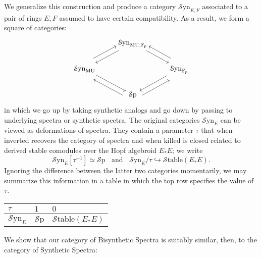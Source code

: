 \documentclass[10pt]{amsart}
\theoremstyle{definition}
\numberwithin{figure}{section}
\numberwithin{equation}{section}
\newcommand{\MU}{\mathrm{MU}}
\theoremstyle{cited}
\newcommand{\bF}{\mathbb{F}}
\newcommand{\Sp}{{\mathcal{S}\mathrm{p}}}
\newcommand{\Syn}{\mathcal{S}\mathrm{yn}}
\newcommand{\Stable}{\mathcal{S}\mathrm{table}}
\begin{document}
We generalize this construction and produce a category $\Syn_{E,F}$ associated to a pair of rings $E,F$ assumed to have certain compatibility. As a result, we form a square of categories:
\[\begin{tikzcd}
	& {\Syn_{\MU,\bF_p}} \\
	{\Syn_{\MU}} && {\Syn_{\bF_p}} \\
	& \Sp
	\arrow[from=1-2, to=2-1]
	\arrow[from=1-2, to=2-3]
	\arrow[shift left=3, from=2-1, to=1-2]
	\arrow[from=2-1, to=3-2]
	\arrow[shift right=3, from=2-3, to=1-2]
	\arrow[from=2-3, to=3-2]
	\arrow[shift left=3, from=3-2, to=2-1]
	\arrow[shift right=3, from=3-2, to=2-3]
\end{tikzcd}\]
in which we go up by taking synthetic analogs and go down by passing to underlying spectra or synthetic spectra. The original categories $\Syn_E$ can be viewed as deformations of spectra. They contain a parameter $\tau$ that when inverted recovers the category of spectra and when killed is closed related to derived stable comodules over the Hopf algebroid $E_*E$; we write
\[
\Syn_E[\tau^{-1}] \simeq \Sp\;\;\text{ and }\;\;\Syn_E/\tau \hookrightarrow \Stable(E_*E).
\]
Ignoring the difference between the latter two categories momentarily, we may summarize this information in a table in which the top row specifies the value of $\tau$.

\begin{table}[!ht]
  \centering
  \begin{tabular}{|l|l|l|}
  \hline
      $\tau$ & $1$ & $0$ \\ \hline
      $\Syn_E$ & $\Sp$ & $\Stable(E_*E)$ \\ \hline
  \end{tabular}
\end{table}

We show that our category of Bisynthetic Spectra is suitably similar, then, to the category of Synthetic Spectra:
\end{document}
